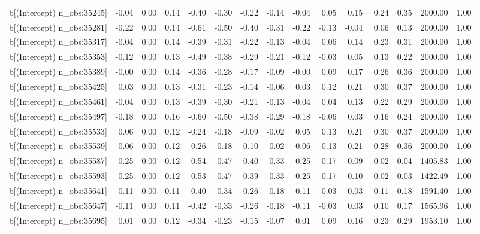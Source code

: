 \begin{table}[ht]
\begin{tabular}{rrrrrrrrrrrrrrr}
  b[(Intercept) n\_obs:35245] & -0.04 & 0.00 & 0.14 & -0.40 & -0.30 & -0.22 & -0.14 & -0.04 & 0.05 & 0.15 & 0.24 & 0.35 & 2000.00 & 1.00 \\ 
  b[(Intercept) n\_obs:35281] & -0.22 & 0.00 & 0.14 & -0.61 & -0.50 & -0.40 & -0.31 & -0.22 & -0.13 & -0.04 & 0.06 & 0.13 & 2000.00 & 1.00 \\ 
  b[(Intercept) n\_obs:35317] & -0.04 & 0.00 & 0.14 & -0.39 & -0.31 & -0.22 & -0.13 & -0.04 & 0.06 & 0.14 & 0.23 & 0.31 & 2000.00 & 1.00 \\ 
  b[(Intercept) n\_obs:35353] & -0.12 & 0.00 & 0.13 & -0.49 & -0.38 & -0.29 & -0.21 & -0.12 & -0.03 & 0.05 & 0.13 & 0.22 & 2000.00 & 1.00 \\ 
  b[(Intercept) n\_obs:35389] & -0.00 & 0.00 & 0.14 & -0.36 & -0.28 & -0.17 & -0.09 & -0.00 & 0.09 & 0.17 & 0.26 & 0.36 & 2000.00 & 1.00 \\ 
  b[(Intercept) n\_obs:35425] & 0.03 & 0.00 & 0.13 & -0.31 & -0.23 & -0.14 & -0.06 & 0.03 & 0.12 & 0.21 & 0.30 & 0.37 & 2000.00 & 1.00 \\ 
  b[(Intercept) n\_obs:35461] & -0.04 & 0.00 & 0.13 & -0.39 & -0.30 & -0.21 & -0.13 & -0.04 & 0.04 & 0.13 & 0.22 & 0.29 & 2000.00 & 1.00 \\ 
  b[(Intercept) n\_obs:35497] & -0.18 & 0.00 & 0.16 & -0.60 & -0.50 & -0.38 & -0.29 & -0.18 & -0.06 & 0.03 & 0.16 & 0.24 & 2000.00 & 1.00 \\ 
  b[(Intercept) n\_obs:35533] & 0.06 & 0.00 & 0.12 & -0.24 & -0.18 & -0.09 & -0.02 & 0.05 & 0.13 & 0.21 & 0.30 & 0.37 & 2000.00 & 1.00 \\ 
  b[(Intercept) n\_obs:35539] & 0.06 & 0.00 & 0.12 & -0.26 & -0.18 & -0.10 & -0.02 & 0.06 & 0.13 & 0.21 & 0.28 & 0.36 & 2000.00 & 1.00 \\ 
  b[(Intercept) n\_obs:35587] & -0.25 & 0.00 & 0.12 & -0.54 & -0.47 & -0.40 & -0.33 & -0.25 & -0.17 & -0.09 & -0.02 & 0.04 & 1405.83 & 1.00 \\ 
  b[(Intercept) n\_obs:35593] & -0.25 & 0.00 & 0.12 & -0.53 & -0.47 & -0.39 & -0.33 & -0.25 & -0.17 & -0.10 & -0.02 & 0.03 & 1422.49 & 1.00 \\ 
  b[(Intercept) n\_obs:35641] & -0.11 & 0.00 & 0.11 & -0.40 & -0.34 & -0.26 & -0.18 & -0.11 & -0.03 & 0.03 & 0.11 & 0.18 & 1591.40 & 1.00 \\ 
  b[(Intercept) n\_obs:35647] & -0.11 & 0.00 & 0.11 & -0.42 & -0.33 & -0.26 & -0.18 & -0.11 & -0.03 & 0.03 & 0.10 & 0.17 & 1565.96 & 1.00 \\ 
  b[(Intercept) n\_obs:35695] & 0.01 & 0.00 & 0.12 & -0.34 & -0.23 & -0.15 & -0.07 & 0.01 & 0.09 & 0.16 & 0.23 & 0.29 & 1953.10 & 1.00 \\ 

\end{tabular}
\end{table}
